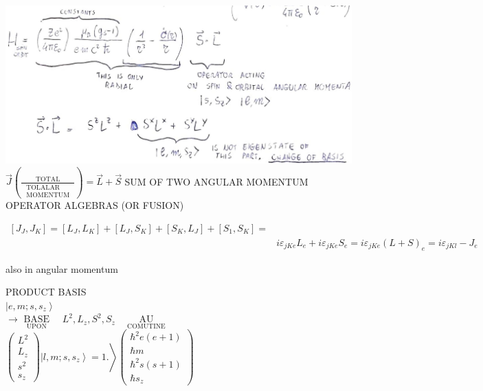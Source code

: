 \documentclass[10pt]{article}
\begin{document}
\includegraphics[max width=\textwidth, center]{2025_10_16_e34e240cf6beac2f9e0dg-3(1)}\\
$\vec{J}\left(\frac{\text { TOTAL }}{\begin{array}{l}\text { TOLALAR } \\ \text { MOMENTUM }\end{array}}\right)=\vec{L}+\vec{S}$ SUM OF TWO ANGULAR MOMENTUM OPERATOR ALGEBRAS (OR FUSION)

$$
\begin{aligned}
{\left[J_{J}, J_{K}\right]=\left[L_{J}, L_{K}\right]+\left[L_{J}, S_{K}\right]+\left[S_{K}, L_{J}\right]+\left[S_{1}, S_{K}\right]=} & \\
& i \varepsilon_{j K e} L_{e}+i \varepsilon_{j K e} S_{e}=i \varepsilon_{j K e}(L+S)_{e}=i \varepsilon_{j K l}-J_{e}
\end{aligned}
$$

also in angular momentum

PRODUCT BASIS\\
$\left|e, m ; s, s_{z}\right\rangle$\\
$\rightarrow \underset{\text { UPON }}{\text { BASE }} \quad L^{2}, L_{z}, S^{2}, S_{z} \quad \underset{\text { COMUTINE }}{\text { AU }}$\\
$\left.\left(\begin{array}{l}L^{2} \\ L_{z} \\ s^{2} \\ s_{z}\end{array}\right)\left|l, m ; s, s_{z}\right\rangle=1.\right\rangle\left(\begin{array}{c}\hbar^{2} e(e+1) \\ \hbar m \\ \hbar^{2} s(s+1) \\ \hbar s_{z}\end{array}\right)$
\end{document}

